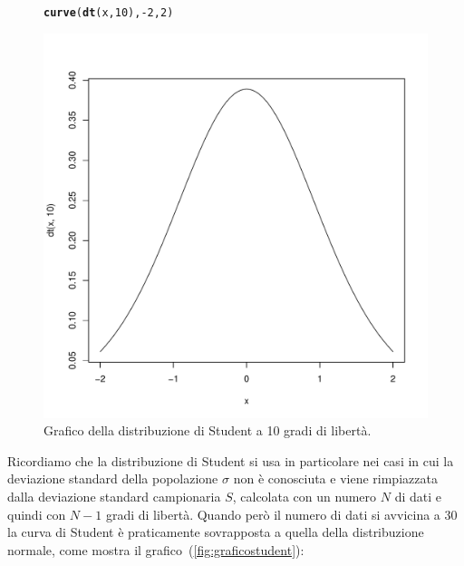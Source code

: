 \documentclass[onecolumn,12pt]{book}\usepackage[]{graphicx}\usepackage[]{color}
\makeatletter
\def\maxwidth{ %
  \ifdim\Gin@nat@width>\linewidth
    \linewidth
  \else
    \Gin@nat@width
  \fi
}
\newcommand{\hlnum}[1]{\textcolor[rgb]{0.686,0.059,0.569}{#1}}%
\newcommand{\hlopt}[1]{\textcolor[rgb]{0,0,0}{#1}}%
\newcommand{\hlstd}[1]{\textcolor[rgb]{0.345,0.345,0.345}{#1}}%
\newcommand{\hlkwd}[1]{\textcolor[rgb]{0.737,0.353,0.396}{\textbf{#1}}}%
\newenvironment{kframe}{%
 \def\at@end@of@kframe{}%
 \ifinner\ifhmode%
  \def\at@end@of@kframe{\end{minipage}}%
  \begin{minipage}{\columnwidth}%
 \fi\fi%
 \def\FrameCommand##1{\hskip\@totalleftmargin \hskip-\fboxsep
 \colorbox{shadecolor}{##1}\hskip-\fboxsep
     \hskip-\linewidth \hskip-\@totalleftmargin \hskip\columnwidth}%
 \MakeFramed {\advance\hsize-\width
   \@totalleftmargin\z@ \linewidth\hsize
   \@setminipage}}%
 {\par\unskip\endMakeFramed%
 \at@end@of@kframe}
\newenvironment{knitrout}{}{} %
\makeatother
\begin{document}
\begin{figure}[H]
\begin{center}
\begin{knitrout}
\color{fgcolor}\begin{kframe}
\begin{alltt}
\hlkwd{curve}\hlstd{(}\hlkwd{dt}\hlstd{(x,}\hlnum{10}\hlstd{),}\hlopt{-}\hlnum{2}\hlstd{,}\hlnum{2}\hlstd{)}
\end{alltt}
\end{kframe}
\includegraphics[width=\maxwidth]{figure/unnamed-chunk-150-1} 

\end{knitrout}
\caption{Grafico della distribuzione di Student a 10 gradi di libert\`a. }
\label{fig:graficostudent1}
\end{center}
\end{figure}
Ricordiamo che la distribuzione di Student si usa in  particolare nei casi in cui la deviazione standard della popolazione $\sigma$  non \`e conosciuta e viene rimpiazzata  dalla deviazione standard campionaria  $S$, calcolata con un numero $N$ di dati e quindi con $N-1$ gradi di libert\`a. Quando per\`o il numero di dati si avvicina a 30 la curva di Student \`e praticamente sovrapposta a quella della distribuzione normale, come mostra il grafico~(\ref{fig:graficostudent}):
\end{document}
